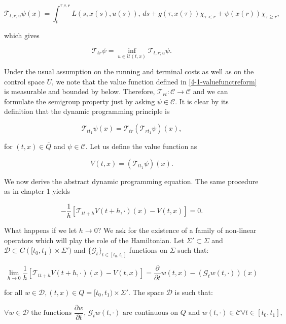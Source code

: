 \begin{equation*}\label{4-1-valuefunctreform}
    \mathcal{T}_{t,r;u}\psi(x) = \int_t^{\tau\wedge r}L(s,x(s),u(s)),\,ds + g(\tau,x(\tau))\chi_{\tau<r} + \psi(x(r))\chi_{\tau\geq r}, 
\end{equation*}

which gives

\begin{equation}\label{4-1-defofT_dynam}
    \mathcal{T}_{tr}\psi = \inf_{u\in\mathcal{U}(t,x)} \mathcal{T}_{t,r;u}\psi.
\end{equation}

Under the usual assumption on the running and terminal costs as well as on the control space $U$, we note that the value function defined in \ref{4-1-valuefunctreform} 
is measurable and bounded by below. Therefore, $\mathcal{T}_{rt}:\mathcal{C}\rightarrow\mathcal{C}$ and we can formulate the semigroup property just by asking $\psi\in\mathcal{C}$. 
It is clear by its definition that the dynamic programming principle is

\[\mathcal{T}_{tt_1}\psi(x)=\mathcal{T}_{tr}\left(\mathcal{T}_{rt_1}\psi\right)(x),\]

for $(t,x)\in\overline{Q}$ and $\psi\in\mathcal{C}$. Let us define the value function as

\begin{equation}
    V(t,x) = (\mathcal{T}_{tt_1}\psi)(x).
\end{equation}

We now derive the abstract dynamic programming equation. The same procedure as in chapter 1 yields

\[-\frac{1}{h}\left[\mathcal{T}_{tt+h}V(t+h,\cdot)(x)-V(t,x)\right]=0.\]

What happens if we let $h\to0$? We ask for the existence of a family of non-linear operators which will play the role of the Hamiltonian. 
Let $\Sigma'\subset\Sigma$ and $\mathcal{D}\subset C([t_0,t_1)\times\Sigma')$ and $\{\mathcal{G}_t\}_{t\in[t_0,t_1]}$ functions on $\Sigma$ such that:

\begin{equation}\label{4-1-conditiononG_t}
    \lim_{h\to 0}\frac{1}{h}\left[\mathcal{T}_{tt+h}V(t+h,\cdot)(x)-V(t,x)\right] = \frac{\partial}{\partial t}w(t,x) - (\mathcal{G}_tw(t,\cdot))(x)
\end{equation}

for all $w\in\mathcal{D},(t,x)\in Q=[t_0,t_1)\times\Sigma'$. The space $\mathcal{D}$ is such that:

\begin{equation}\label{4-1-conditiononD}
    \forall w\in\mathcal{D} \text{ the functions }\frac{\partial w}{\partial t},\,\mathcal{G}_tw(t,\cdot) \text{ are continuous on $Q$ and }w(t,\cdot)\in\mathcal{C} \forall t\in[t_0,t_1], 
\end{equation}

